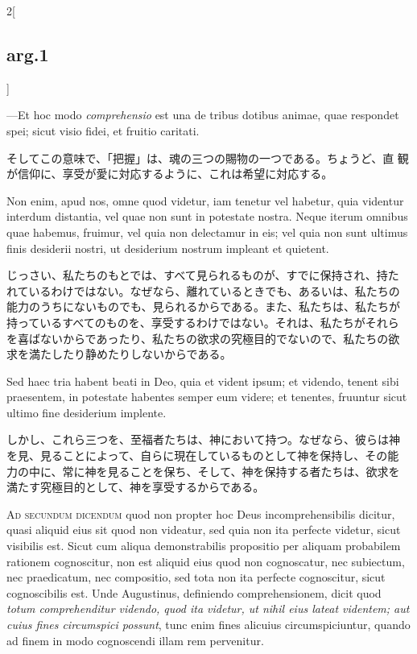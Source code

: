 \documentclass[paper=a4paper,fontsize=10pt,jafontsize=9pt,titlepage]{jlreq}
\begin{document}
\begin{paracol}{2}[\subsection{arg.1}]
\switchcolumn*

---Et hoc modo {\itshape comprehensio} est una de tribus dotibus animae,
quae respondet spei; sicut visio fidei, et fruitio caritati.

\switchcolumn

そしてこの意味で、「把握」は、魂の三つの賜物の一つである。ちょうど、直
観が信仰に、享受が愛に対応するように、これは希望に対応する。

\switchcolumn*

Non enim, apud nos, omne quod videtur, iam tenetur vel habetur, quia
videntur interdum distantia, vel quae non sunt in potestate
nostra. Neque iterum omnibus quae habemus, fruimur, vel quia non
delectamur in eis; vel quia non sunt ultimus finis desiderii nostri,
ut desiderium nostrum impleant et quietent.

\switchcolumn

じっさい、私たちのもとでは、すべて見られるものが、すでに保持され、持た
れているわけではない。なぜなら、離れているときでも、あるいは、私たちの
能力のうちにないものでも、見られるからである。また、私たちは、私たちが
持っているすべてのものを、享受するわけではない。それは、私たちがそれら
を喜ばないからであったり、私たちの欲求の究極目的でないので、私たちの欲
求を満たしたり静めたりしないからである。

\switchcolumn*

Sed haec tria habent beati in Deo, quia et vident ipsum; et videndo,
tenent sibi praesentem, in potestate habentes semper eum videre; et
tenentes, fruuntur sicut ultimo fine desiderium implente.

\switchcolumn

しかし、これら三つを、至福者たちは、神において持つ。なぜなら、彼らは神
を見、見ることによって、自らに現在しているものとして神を保持し、その能
力の中に、常に神を見ることを保ち、そして、神を保持する者たちは、欲求を
満たす究極目的として、神を享受するからである。

\switchcolumn*[\subsection{ad.2}]

{\scshape Ad secundum dicendum} quod non propter hoc Deus
incomprehensibilis dicitur, quasi aliquid eius sit quod non videatur,
sed quia non ita perfecte videtur, sicut visibilis est. Sicut cum
aliqua demonstrabilis propositio per aliquam probabilem rationem
cognoscitur, non est aliquid eius quod non cognoscatur, nec subiectum,
nec praedicatum, nec compositio, sed tota non ita perfecte
cognoscitur, sicut cognoscibilis est. Unde Augustinus, definiendo
comprehensionem, dicit quod {\itshape totum comprehenditur videndo, quod
ita videtur, ut nihil eius lateat videntem; aut cuius fines
circumspici possunt}, tunc enim fines alicuius circumspiciuntur,
quando ad finem in modo cognoscendi illam rem pervenitur.


\end{paracol}
\end{document}
